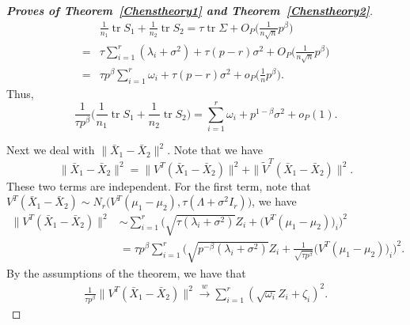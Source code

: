 \documentclass[review]{elsarticle}
\DeclareMathOperator{\mytr}{tr}
\theoremstyle{plain}
\theoremstyle{definition}
\theoremstyle{remark}
\begin{document}
\begin{proof}[\textbf{Proves of Theorem~\ref{Chenstheory1} and Theorem~\ref{Chenstheory2}}]
$$\begin{aligned}
        &\frac{1}{n_1}\mytr S_1+\frac{1}{n_2}\mytr S_2=
    \tau \mytr \Sigma+O_P\Big(\frac{1}{n\sqrt{n}}p^{\beta}\Big)\\
        =&\tau \sum_{i=1}^r (\lambda_i+\sigma^2)+\tau(p-r)\sigma^2+O_P\Big(\frac{1}{n\sqrt{n}}p^{\beta}\Big)\\
        =&\tau p^{\beta} \sum_{i=1}^r \omega_i+\tau(p-r)\sigma^2+o_P\Big(\frac{1}{n}p^{\beta}\Big).
    \end{aligned}
    $$
Thus,
        \begin{equation}\label{eq:kkk1}
        \frac{1}{\tau p^\beta}\big(\frac{1}{n_1}\mytr S_1+\frac{1}{n_2}\mytr S_2\big)
        =\sum_{i=1}^r \omega_i+p^{1-\beta}\sigma^2+o_P(1).
        \end{equation}

    Next we deal with $\|\bar{X}_1-\bar{X}_2\|^2$.
    Note that we have
    $$
    \|\bar{X}_1-\bar{X}_2\|^2=
    \|V^T(\bar{X}_1-\bar{X}_2)\|^2+
    \|\tilde{V}^T(\bar{X}_1-\bar{X}_2)\|^2.
    $$
    These two terms are independent.
    For the first term, note that $V^T(\bar{X}_1-\bar{X}_2)\sim N_r\big(V^T (\mu_1-\mu_2),\tau (\Lambda+\sigma^2 I_r)\big)$, we have
    $$
    \begin{aligned}
        \|V^T(\bar{X}_1-\bar{X}_2)\|^2&\sim
        \sum_{i=1}^r \Big(\sqrt{\tau (\lambda_i+\sigma^2)}Z_i+\big(V^T (\mu_1-\mu_2)\big)_i \Big)^2\\
        &=\tau p^{\beta}
        \sum_{i=1}^r
        \Big( \sqrt{p^{-\beta}(\lambda_i+\sigma^2)}Z_i+\frac{1}{\sqrt{\tau p^{\beta}}}\big(V^T (\mu_1-\mu_2)\big)_i \Big)^2.
    \end{aligned}
    $$
    By the assumptions of the theorem,  we have that
    \begin{equation}\label{eq:kkk2}
    \begin{aligned}
        \frac{1}{\tau p^{\beta}}\|V^T(\bar{X}_1-\bar{X}_2)\|^2
        \xrightarrow{w}
        \sum_{i=1}^r (\sqrt{\omega_i} Z_i+\zeta_i)^2.
    \end{aligned}
    \end{equation}


\end{proof}
\end{document}
